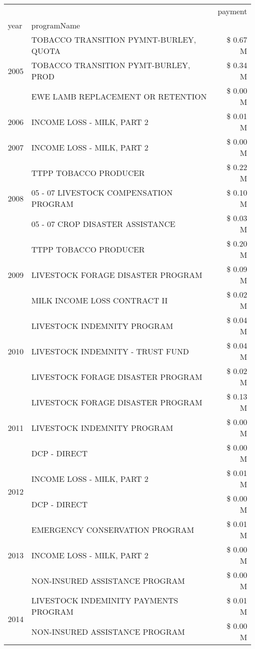 \begin{tabular}{llr}
\toprule
 &  & payment \\
year & programName &  \\
\midrule
\multirow[t]{3}{*}{2005} & TOBACCO TRANSITION PYMNT-BURLEY, QUOTA & \$ 0.67 M \\
 & TOBACCO TRANSITION PYMT-BURLEY, PROD & \$ 0.34 M \\
 & EWE LAMB REPLACEMENT OR RETENTION & \$ 0.00 M \\
\cline{1-3}
2006 & INCOME LOSS - MILK, PART 2 & \$ 0.01 M \\
\cline{1-3}
2007 & INCOME LOSS - MILK, PART 2 & \$ 0.00 M \\
\cline{1-3}
\multirow[t]{3}{*}{2008} & TTPP TOBACCO PRODUCER & \$ 0.22 M \\
 & 05 - 07 LIVESTOCK COMPENSATION PROGRAM & \$ 0.10 M \\
 & 05 - 07 CROP DISASTER ASSISTANCE & \$ 0.03 M \\
\cline{1-3}
\multirow[t]{3}{*}{2009} & TTPP TOBACCO PRODUCER & \$ 0.20 M \\
 & LIVESTOCK FORAGE DISASTER  PROGRAM & \$ 0.09 M \\
 & MILK INCOME LOSS CONTRACT II & \$ 0.02 M \\
\cline{1-3}
\multirow[t]{3}{*}{2010} & LIVESTOCK INDEMNITY PROGRAM & \$ 0.04 M \\
 & LIVESTOCK INDEMNITY - TRUST FUND & \$ 0.04 M \\
 & LIVESTOCK FORAGE DISASTER PROGRAM & \$ 0.02 M \\
\cline{1-3}
\multirow[t]{3}{*}{2011} & LIVESTOCK FORAGE DISASTER PROGRAM & \$ 0.13 M \\
 & LIVESTOCK INDEMNITY PROGRAM & \$ 0.00 M \\
 & DCP - DIRECT & \$ 0.00 M \\
\cline{1-3}
\multirow[t]{2}{*}{2012} & INCOME LOSS - MILK, PART 2 & \$ 0.01 M \\
 & DCP - DIRECT & \$ 0.00 M \\
\cline{1-3}
\multirow[t]{3}{*}{2013} & EMERGENCY CONSERVATION PROGRAM & \$ 0.01 M \\
 & INCOME LOSS - MILK, PART 2 & \$ 0.00 M \\
 & NON-INSURED ASSISTANCE PROGRAM & \$ 0.00 M \\
\cline{1-3}
\multirow[t]{3}{*}{2014} & LIVESTOCK INDEMINITY PAYMENTS PROGRAM & \$ 0.01 M \\
 & NON-INSURED ASSISTANCE PROGRAM & \$ 0.00 M \\

\end{tabular}
